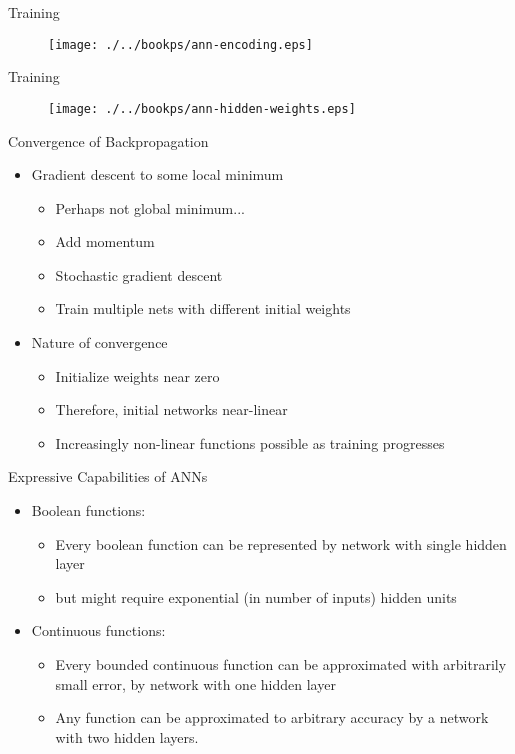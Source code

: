 \documentclass[%
pdf,
colorBG,
slideColor,
tcrico,
]{prosper}
\begin{document}
\begin{slide}{  Training  } 
\begin{figure}
	\centering
	\texttt{[image: ./../bookps/ann-encoding.eps]}
\end{figure}
\end{slide}


\begin{slide}{  Training  } 
\begin{figure}
	\centering
	\texttt{[image: ./../bookps/ann-hidden-weights.eps]}
\end{figure}
\end{slide}

\begin{slide}{  Convergence of Backpropagation  } 
\tiny
\begin{itemize}
 \item  Gradient descent to some local minimum
	\begin{itemize}
	\item Perhaps not global minimum...
	\item Add momentum
	\item Stochastic gradient descent
	\item Train multiple nets with different initial weights
	\end{itemize}
\item Nature of convergence
	\begin{itemize}
	\item Initialize weights near zero
	\item Therefore, initial networks near-linear
	\item Increasingly non-linear functions possible as training progresses
	\end{itemize}
\end{itemize}
\end{slide}



\begin{slide}{  Expressive Capabilities of ANNs  } 
\tiny
\begin{itemize} 
 \item  Boolean functions:
	\begin{itemize}
	\item Every boolean function can be represented by network with single hidden
	layer
	\item but might require exponential (in number of inputs) hidden units
	\end{itemize}
\item Continuous functions:
	\begin{itemize}
	\item
	Every bounded continuous function can be approximated with arbitrarily small
	error, by network with one hidden layer 
	
	\item
	Any function can be approximated to arbitrary accuracy by a network with two
	hidden layers.
	\end{itemize}
\end{itemize}
\end{slide}
\end{document}

